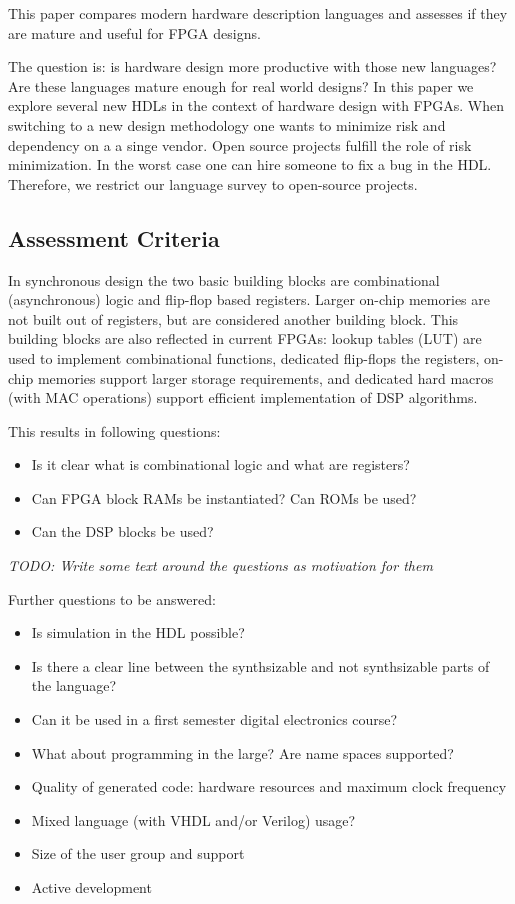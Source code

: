\documentclass[10pt, technote, draftcls, onecolumn]{IEEEtran}
\newcommand{\todo}[1]{{\emph{TODO: #1}}}
\begin{document}
This paper compares modern hardware description languages and
assesses if they are mature and useful for FPGA designs.

The question is: is hardware design more productive with those new
languages? Are these languages mature enough for real world designs?
In this paper we explore several new HDLs in the context of hardware
design with FPGAs. When switching to a new design methodology one
wants to minimize risk and dependency on a a singe vendor. Open source
projects fulfill the role of risk minimization. In the worst case one can hire
someone to fix a bug in the HDL. Therefore, we restrict our language survey
to open-source projects.

\subsection{Assessment Criteria}


In synchronous design the two basic building blocks are combinational
(asynchronous) logic and flip-flop based registers. Larger on-chip
memories are not built out of registers, but are considered another building
block. This building blocks are also reflected in current FPGAs: lookup tables
(LUT) are used to implement combinational functions, dedicated flip-flops
the registers, on-chip memories support larger storage requirements,
and dedicated hard macros (with MAC operations) support efficient
implementation of DSP algorithms.

This results in following questions:
\begin{itemize}
\item Is it clear what is combinational logic and what are registers?
\item Can FPGA block RAMs be instantiated? Can ROMs be used?
\item Can the DSP blocks be used?
\end{itemize}

\todo{Write some text around the questions as motivation for them}

Further questions to be answered:

\begin{itemize}
\item Is simulation in the HDL possible?
\item Is there a clear line between the synthsizable  and not synthsizable parts of the language?
\item Can it be used in a first semester digital electronics course?
\item What about programming in the large? Are name spaces supported?
\item Quality of generated code: hardware resources and maximum clock frequency
\item Mixed language (with VHDL and/or Verilog) usage?
\item Size of the user group and support
\item Active development
\end{itemize}
\end{document}
